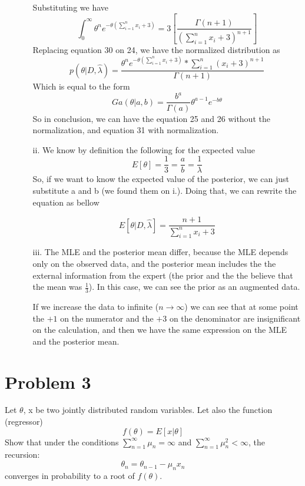\documentclass[conference, onecolumn]{IEEEtran}
\begin{document}
\begin{itemize}
\begin{itemize}
			Substituting we have
			\begin{equation}
				\int_{0}^{\infty} \theta^n e^{- \theta (\sum_{i=1}^{n}x_i + 3)} = 3[\frac{\Gamma(n+1)}{(\sum_{i=1}^{n}x_i + 3)^{n+1}}]
			\end{equation}
			Replacing equation 30 on 24, we have the normalized distribution as 
			\begin{equation}
				p(\theta|D,\hat{\lambda}) = \frac{\theta^n e^{- \theta (\sum_{i=1}^{n} x_i + 3)} * \sum_{i=1}^{n}(x_i + 3)^{n+1}}{\Gamma(n+1)}
			\end{equation}
			Which is equal to the form
			\begin{equation}
				Ga(\theta|a,b)= \frac{b^a}{\Gamma(a)} \theta^{a-1} e^{-b\theta}
			\end{equation}
			So in conclusion, we can have the equation 25 and 26 without the normalization, and equation 31 with normalization.
			
			\item [ii.]
			We know by definition the following for the expected value
			\begin{equation}
				E[\theta] = \frac{1}{3} = \frac{a}{b} = \frac{1}{\lambda}
			\end{equation}
			So, if we want to know the expected value of the posterior, we can just substitute a and b (we found them on i.). Doing that, we can rewrite the equation as bellow
			
			\begin{equation}
				E[\theta|D, \hat{\lambda}] = \frac{n + 1}{\sum_{i=1}^{n} x_i + 3}
			\end{equation}
			
			\item [iii.]
			The MLE and the posterior mean differ, because the MLE depends only on the observed data, and the posterior mean includes the the external information from the expert (the prior and the the believe that the mean was $\frac{1}{3}$). In this case, we can see the prior as an augmented data.
			
			If we increase the data to infinite ($n \to \infty$) we can see that at some point the $+1$ on the numerator and the $+3$ on the denominator are insignificant on the calculation, and then we have the same expression on the MLE and the posterior mean.
		\end{itemize}
	\end{itemize}
	
	\section*{Problem 3}
	Let $\theta$, x be two jointly distributed random variables. Let also the function (regressor)
	\begin{equation}
		f(\theta) = E[x|\theta]
	\end{equation}
	Show that under the conditions $\sum_{n=1}^{\infty} \mu_n = \infty$ and $\sum_{n=1}^{\infty} \mu_n^2 < \infty$, the recursion:
	\begin{equation}
		\theta_n = \theta_{n-1} - \mu_nx_n
	\end{equation}
	converges in probability to a root of $f(\theta)$.
	
\end{document}
